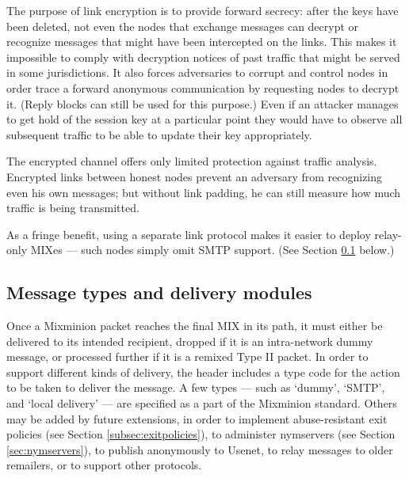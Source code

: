 \documentclass{llncs}
\begin{document}
%

The purpose of link encryption is to provide forward secrecy: 
after the keys have been deleted, not even the
nodes that exchange messages can decrypt or recognize messages
that might have been intercepted on the links. This makes it
impossible to comply with decryption notices of past traffic 
that might be served in
some jurisdictions.  
It also forces adversaries to 
corrupt and control nodes in order trace
a forward anonymous communication by requesting nodes to decrypt
it. 
(Reply blocks can still be used for this purpose.)  Even if an
attacker manages to get hold of the session key at a particular point
they would have to observe all subsequent traffic to be able to update
their key appropriately.

The encrypted channel offers only limited protection against traffic
analysis. Encrypted links between honest nodes prevent an adversary
from recognizing even his own messages; but without link padding, he
can still measure how much traffic is being transmitted.

As a fringe benefit, using a separate link protocol makes it
easier to deploy relay-only MIXes --- such nodes simply omit SMTP
support.  (See Section \ref{subsec:delivery-modules} below.)

\subsection{Message types and delivery modules}
\label{subsec:delivery-modules}

Once a Mixminion packet reaches the final MIX in its path, it must
either be delivered to its intended recipient, dropped if it is an
intra-network dummy message, or processed further if it is a remixed
Type II packet. In order to support different kinds of
delivery, the header includes a type code for the action to be taken
to deliver the message.  A few types --- such as `dummy', `SMTP', and
`local delivery' --- are specified as a part of the Mixminion
standard.  Others may be added by future extensions, in order to
implement abuse-resistant exit policies (see Section
\ref{subsec:exitpolicies}), to administer nymservers (see Section
\ref{sec:nymservers}), to publish anonymously to Usenet, to relay
messages to older remailers, or to support other protocols.
\end{document}
